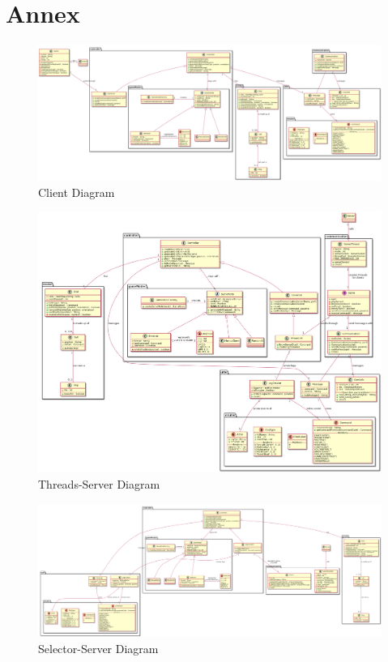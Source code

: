 \section*{Annex}
\begin{figure}
    \includegraphics[width=\textwidth,height=\textheight,keepaspectratio]{../diagrams/class-diagrams/clientClasses.png}
    \caption{Client Diagram}
    \label{fig:PropProf}
\end{figure}
\begin{figure}
    \includegraphics[width=\textwidth,height=\textheight,keepaspectratio]{../diagrams/class-diagrams/threadsClasses.png}
    \caption{Threads-Server Diagram}
    \label{fig:PropProf}
\end{figure}
\begin{figure}
    \includegraphics[width=\textwidth,height=\textheight,keepaspectratio]{../diagrams/class-diagrams/selectorClasses.png}
    \caption{Selector-Server Diagram}
    \label{fig:PropProf}
\end{figure}

	